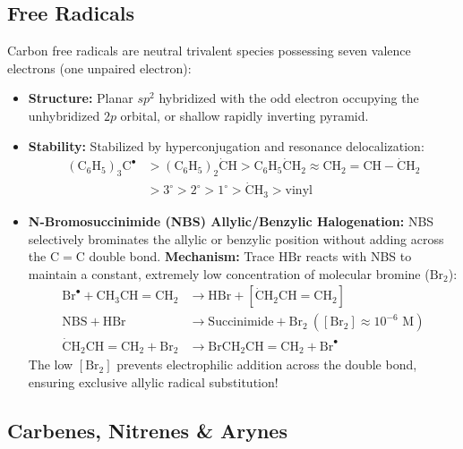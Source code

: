 \documentclass[10pt,twoside,openright]{book}
\begin{document}
\subsection{Free Radicals}

\begin{conceptbox}
Carbon free radicals are neutral trivalent species possessing seven valence electrons (one unpaired electron):
\begin{itemize}
  \item \textbf{Structure:} Planar $sp^2$ hybridized with the odd electron occupying the unhybridized $2p$ orbital, or shallow rapidly inverting pyramid.
  \item \textbf{Stability:} Stabilized by hyperconjugation and resonance delocalization:
  \begin{align}
    \mathrm{(C_6H_5)_3C^\bullet} &> \mathrm{(C_6H_5)_2\dot{C}H} > \mathrm{C_6H_5\dot{C}H_2} \approx \mathrm{CH_2=CH-\dot{C}H_2} \\
    &> 3^\circ > 2^\circ > 1^\circ > \mathrm{\dot{C}H_3} > \text{vinyl}
  \end{align}
  \item \textbf{N-Bromosuccinimide (NBS) Allylic/Benzylic Halogenation:}
  NBS selectively brominates the allylic or benzylic position without adding across the $\mathrm{C=C}$ double bond.
  \textbf{Mechanism:} Trace $\mathrm{HBr}$ reacts with NBS to maintain a constant, extremely low concentration of molecular bromine ($\mathrm{Br_2}$):
  \begin{align}
    \mathrm{Br}^\bullet + \mathrm{CH_3CH=CH_2} &\longrightarrow \mathrm{HBr} + [\mathrm{\dot{C}H_2CH=CH_2}] \\
    \mathrm{NBS} + \mathrm{HBr} &\longrightarrow \text{Succinimide} + \mathrm{Br_2} \ ([\mathrm{Br_2}] \approx 10^{-6}\text{ M})\\
    \mathrm{\dot{C}H_2CH=CH_2} + \mathrm{Br_2} &\longrightarrow \mathrm{BrCH_2CH=CH_2} + \mathrm{Br}^\bullet
  \end{align}
  The low $[\mathrm{Br_2}]$ prevents electrophilic addition across the double bond, ensuring exclusive allylic radical substitution!
\end{itemize}
\end{conceptbox}

\subsection{Carbenes, Nitrenes \& Arynes}
\end{document}
